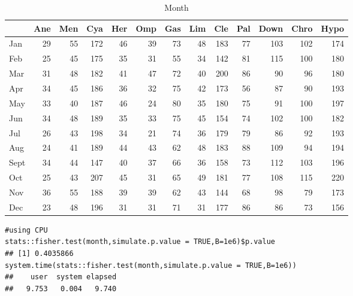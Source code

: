\documentclass[article,nojss]{jss}\usepackage[]{graphicx}\usepackage[]{color}
\makeatletter
\newenvironment{kframe}{%
 \def\at@end@of@kframe{}%
 \ifinner\ifhmode%
  \def\at@end@of@kframe{\end{minipage}}%
  \begin{minipage}{\columnwidth}%
 \fi\fi%
 \def\FrameCommand##1{\hskip\@totalleftmargin \hskip-\fboxsep
 \colorbox{shadecolor}{##1}\hskip-\fboxsep
     \hskip-\linewidth \hskip-\@totalleftmargin \hskip\columnwidth}%
 \MakeFramed {\advance\hsize-\width
   \@totalleftmargin\z@ \linewidth\hsize
   \@setminipage}}%
 {\par\unskip\endMakeFramed%
 \at@end@of@kframe}
\newenvironment{knitrout}{}{} %
\makeatother
\begin{document}
\begin{knitrout}
\color{fgcolor}\begin{table}[H]

\caption{\label{tab:monthdata}Month\label{tab:month}}
\centering
\begin{tabular}[t]{l|r|r|r|r|r|r|r|r|r|r|r|r}
\hline
  & Ane & Men & Cya & Her & Omp & Gas & Lim & Cle & Pal & Down & Chro & Hypo\\
\hline
Jan & 29 & 55 & 172 & 46 & 39 & 73 & 48 & 183 & 77 & 103 & 102 & 174\\
\hline
Feb & 25 & 45 & 175 & 35 & 31 & 55 & 34 & 142 & 81 & 115 & 100 & 180\\
\hline
Mar & 31 & 48 & 182 & 41 & 47 & 72 & 40 & 200 & 86 & 90 & 96 & 180\\
\hline
Apr & 34 & 45 & 186 & 36 & 32 & 75 & 42 & 173 & 56 & 87 & 90 & 193\\
\hline
May & 33 & 40 & 187 & 46 & 24 & 80 & 35 & 180 & 75 & 91 & 100 & 197\\
\hline
Jun & 34 & 48 & 189 & 35 & 33 & 75 & 45 & 154 & 74 & 102 & 100 & 182\\
\hline
Jul & 26 & 43 & 198 & 34 & 21 & 74 & 36 & 179 & 79 & 86 & 92 & 193\\
\hline
Aug & 24 & 41 & 189 & 44 & 43 & 62 & 48 & 183 & 88 & 109 & 94 & 194\\
\hline
Sept & 34 & 44 & 147 & 40 & 37 & 66 & 36 & 158 & 73 & 112 & 103 & 196\\
\hline
Oct & 25 & 43 & 207 & 45 & 31 & 65 & 49 & 181 & 77 & 108 & 115 & 220\\
\hline
Nov & 36 & 55 & 188 & 39 & 39 & 62 & 43 & 144 & 68 & 98 & 79 & 173\\
\hline
Dec & 23 & 48 & 196 & 31 & 31 & 71 & 31 & 177 & 86 & 86 & 73 & 156\\
\hline
\end{tabular}
\end{table}

\end{knitrout}
\begin{knitrout}
\color{fgcolor}\begin{kframe}
\begin{verbatim}
#using CPU
stats::fisher.test(month,simulate.p.value = TRUE,B=1e6)$p.value
## [1] 0.4035866
system.time(stats::fisher.test(month,simulate.p.value = TRUE,B=1e6))
##    user  system elapsed 
##   9.753   0.004   9.740
\end{verbatim}
\end{kframe}
\end{knitrout}
\end{document}
